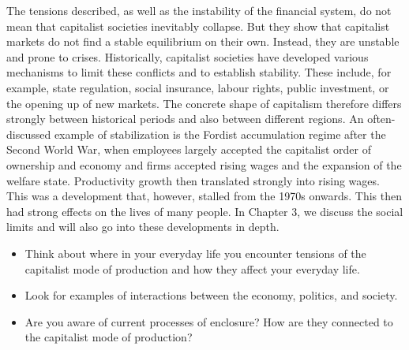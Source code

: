 \documentclass[
  british,
  a4paper,
  DIV=11,
  numbers=noendperiod,
  oneside,
  openany]{scrreprt}
\providecommand{\tightlist}{%
  \setlength{\itemsep}{0pt}\setlength{\parskip}{0pt}}
\begin{document}
The tensions described, as well as the instability of the financial
system, do not mean that capitalist societies inevitably collapse. But
they show that capitalist markets do not find a stable equilibrium on
their own. Instead, they are unstable and prone to crises. Historically,
capitalist societies have developed various mechanisms to limit these
conflicts and to establish stability. These include, for example, state
regulation, social insurance, labour rights, public investment, or the
opening up of new markets. The concrete shape of capitalism therefore
differs strongly between historical periods and also between different
regions. An often-discussed example of stabilization is the Fordist
accumulation regime after the Second World War, when employees largely
accepted the capitalist order of ownership and economy and firms
accepted rising wages and the expansion of the welfare state.
Productivity growth then translated strongly into rising wages. This was
a development that, however, stalled from the 1970s onwards. This then
had strong effects on the lives of many people. In Chapter 3, we discuss
the social limits and will also go into these developments in depth.

\begin{tcolorbox}[enhanced jigsaw, arc=.35mm, bottomrule=.15mm, bottomtitle=1mm, breakable, colback=white, colbacktitle=quarto-callout-caution-color!10!white, colframe=quarto-callout-caution-color-frame, coltitle=black, left=2mm, leftrule=.75mm, opacityback=0, opacitybacktitle=0.6, rightrule=.15mm, title={In-depth questions}, titlerule=0mm, toprule=.15mm, toptitle=1mm]

\begin{itemize}
\tightlist
\item
  Think about where in your everyday life you encounter tensions of the
  capitalist mode of production and how they affect your everyday life.
\item
  Look for examples of interactions between the economy, politics, and
  society.
\item
  Are you aware of current processes of enclosure? How are they
  connected to the capitalist mode of production?
\end{itemize}

\end{tcolorbox}
\end{document}
